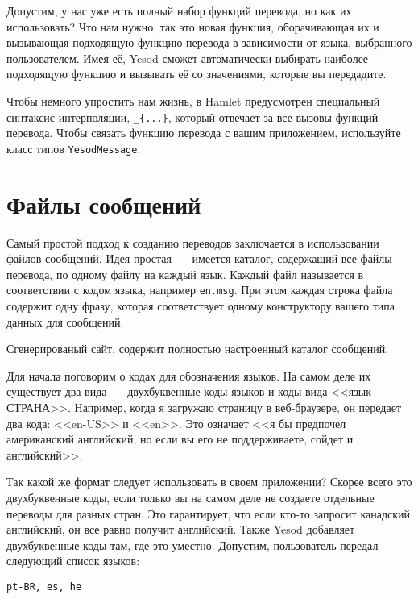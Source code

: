 Допустим, у нас уже есть полный набор функций перевода, но как их использовать? Что нам нужно, так это новая функция, оборачивающая их и вызывающая подходящую функцию перевода в зависимости от языка, выбранного пользователем. Имея её, Yesod сможет автоматически выбирать наиболее подходящую функцию и вызывать её со значениями, которые вы передадите.

Чтобы немного упростить нам жизнь, в Hamlet предусмотрен специальный синтаксис интерполяции, \lstinline'_{...}', который отвечает за все вызовы функций перевода. Чтобы связать функцию перевода с вашим приложением, используйте класс типов \lstinline'YesodMessage'.

\section{Файлы сообщений} %

Самый простой подход к созданию переводов заключается в использовании файлов сообщений. Идея простая~--- имеется каталог, содержащий все файлы перевода, по одному файлу на каждый язык. Каждый файл называется в соответствии с кодом языка, например \lstinline'en.msg'. При этом каждая строка файла содержит одну фразу, которая соответствует одному конструктору вашего типа данных для сообщений.

\begin{remark}
Сгенерированый сайт, содержит полностью настроенный каталог сообщений. %
\end{remark}

Для начала поговорим о кодах для обозначения языков. На самом деле их существует два вида~--- двухбуквенные коды языков и коды вида <<язык-СТРАНА>>. Например, когда я загружаю страницу в веб-браузере, он передает два кода: <<en-US>> и <<en>>. Это означает <<я бы предпочел американский английский, но если вы его не поддерживаете, сойдет и английский>>.

Так какой же формат следует использовать в своем приложении? Скорее всего это двухбуквенные коды, если только вы на самом деле не создаете отдельные переводы для разных стран. Это гарантирует, что если кто-то запросит канадский английский, он все равно получит английский. Также Yesod добавляет двухбуквенные коды там, где это уместно. Допустим, пользователь передал следующий список языков:

\begin{lstlisting}
pt-BR, es, he
\end{lstlisting}

